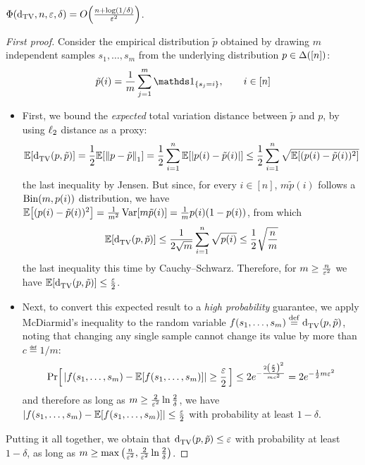 \documentclass[10pt]{article}
\begin{document}
\begin{theorem}\label{theo:learning:tv}
  $\Phi(\dtv,n,\eps,\delta) = \bigO{\frac{n+\log(1/\delta)}{\eps^2}}$.
\end{theorem}
\begin{proof}[First proof]
Consider the empirical distribution $\tilde{p}$ obtained by drawing $m$ independent samples $s_1,\dots,s_m$ from the underlying distribution $p\in\distribs{[n]}$:
\begin{equation}\label{def:empirical}
\tilde{p}(i) = \frac{1}{m} \sum_{j=1}^m \indic{s_j=i}, \qquad i\in [n]
\end{equation}
\begin{itemize}
  \item First, we bound the \emph{expected} total variation distance between $\tilde{p}$ and $p$, by using $\lp[2]$ distance as a proxy:
\[
    \expect{ \totalvardist{p}{\tilde{p}} }
    =\frac{1}{2}\expect{ \normone{p-\tilde{p}}} 
    =\frac{1}{2}\sum_{i=1}^n\expect{ \abs{p(i)-\tilde{p}(i)}}
    \leq\frac{1}{2}\sum_{i=1}^n\sqrt{\expect{ (p(i)-\tilde{p}(i))^2} }
\]
the last inequality by Jensen. But since, for every $i\in[n]$, $m\tilde{p}(i)$ follows a $\binomial{m}{p(i)}$ distribution, we have
$\expect{ (p(i)-\tilde{p}(i))^2} = \frac{1}{m^2}\var[m\tilde{p}(i)] = \frac{1}{m}p(i)(1-p(i))$, from which
\[
    \expect{ \totalvardist{p}{\tilde{p}} } \leq\frac{1}{2\sqrt{m}}\sum_{i=1}^n\sqrt{p(i)} \leq \frac{1}{2}\sqrt{\frac{n}{m}}
\]
the last inequality this time by Cauchy--Schwarz. Therefore, for $m\geq \frac{n}{\eps^2}$ we have $\expect{ \totalvardist{p}{\tilde{p}} }\leq \frac{\eps}{2}$.

  \item Next, to convert this expected result to a \emph{high probability} guarantee, we apply McDiarmid's inequality to the random variable $f(s_1,\dots,s_m) \eqdef \totalvardist{p}{\tilde{p}}$, noting that changing any single sample cannot change its value by more than $c\eqdef 1/m$:
\[
    \probaOf{ \abs{f(s_1,\dots,s_m) - \expect{f(s_1,\dots,s_m)}} \geq \frac{\eps}{2} } \leq 2e^{-\frac{2\left(\frac{\eps}{2}\right)^2}{mc^2}} = 2e^{-\frac{1}{2}m\eps^2}
\]
and therefore as long as $m\geq \frac{2}{\eps^2}\ln\frac{2}{\delta}$, we have $\abs{f(s_1,\dots,s_m) - \expect{f(s_1,\dots,s_m)}} \leq \frac{\eps}{2}$ with probability at least $1-\delta$. 
\end{itemize}
Putting it all together, we obtain that $\totalvardist{p}{\tilde{p}} \leq \eps$ with probability at least $1-\delta$, as long as $m\geq \max\left( \frac{n}{\eps^2},\frac{2}{\eps^2}\ln\frac{2}{\delta} \right)$.
\end{proof}
\end{document}

